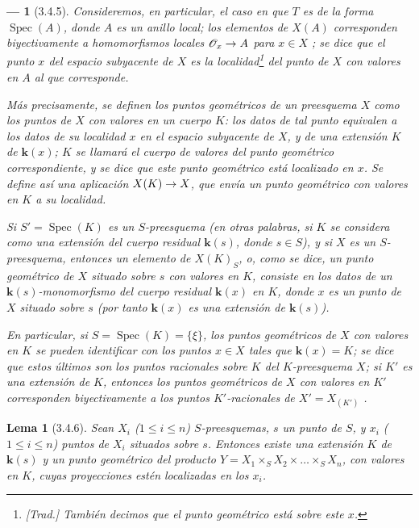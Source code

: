 \documentclass[oneside]{amsart}
\theoremstyle{ega-env-style}
\newtheorem*{env}{---}
\theoremstyle{ega-thm-env-style}
\newtheorem*{lemma}{Lema}
\theoremstyle{ega-defn-env-style}
\def\mathcal{\mathscr}
\def\leq{\leqslant}                 %
\renewcommand{\to}{\mathchoice{\longrightarrow}{\rightarrow}{\rightarrow}{\rightarrow}}
\newcommand{\oldpage}[2][]{{\marginnote{\normalfont{\textbf{#1}~|~#2}}}\ignorespaces}
\let\EGAOriginalLabel\label
\renewcommand{\label}[1]{\phantomsection\EGAOriginalLabel{#1}}
\begin{document}
\begin{env}[3.4.5]
\label{I.3.4.5}
Consideremos, en particular, el caso en que $T$ es de la forma $\operatorname{Spec}(A)$, donde $A$ es un
\emph{anillo local}; los elementos de $X(A)$ corresponden biyectivamente a \emph{homomorfismos
locales} $\mathcal{O}_x\to A$ para $x\in X$ ; se dice que el punto $x$ del espacio
subyacente de $X$ es la \emph{localidad}\footnote{\emph{[Trad.] También decimos que
\emph{el punto geométrico está sobre este $x$}.}} del punto de $X$ con valores en $A$ al que
corresponde.

Más precisamente, se definen los \emph{puntos geométricos} de un preesquema $X$ como los \emph{puntos de
$X$ con valores en un cuerpo $K$}: los datos de tal punto equivalen a los datos de su
\oldpage[I]{113}
localidad $x$ en el espacio subyacente de $X$, y de una \emph{extensión} $K$ de $\boldsymbol{k}(x)$;
$K$ se llamará el \emph{cuerpo de valores} del punto geométrico correspondiente, y se dice que este
punto geométrico está \emph{localizado en $x$}. Se define así una aplicación $X(K)\to X$,
que envía un punto geométrico con valores en $K$ a su localidad.

Si $S'=\operatorname{Spec}(K)$ es un $S$-preesquema (en otras palabras, si $K$ se considera como una extensión
del cuerpo residual $\boldsymbol{k}(s)$, donde $s\in S$), y si $X$ es un $S$-preesquema, entonces un
elemento de $X(K)_S$, o, como se dice, un \emph{punto geométrico de $X$ situado sobre $s$ con valores
en $K$}, consiste en los datos de un $\boldsymbol{k}(s)$-monomorfismo del cuerpo residual $\boldsymbol{k}(x)$
en $K$, donde $x$ es un punto de $X$ \emph{situado sobre $s$} (por tanto $\boldsymbol{k}(x)$ es una
extensión de $\boldsymbol{k}(s)$).

En particular, si $S=\operatorname{Spec}(K)=\{\xi\}$, \emph{los puntos geométricos de $X$ con valores en
$K$ se pueden identificar con los puntos $x\in X$ tales que $\boldsymbol{k}(x)=K$}; se dice que estos últimos
son los \emph{puntos racionales sobre $K$ del $K$-preesquema $X$}; si $K'$ es una extensión de
$K$, entonces los puntos geométricos de $X$ con valores en $K'$ corresponden biyectivamente a los
puntos $K'$-racionales de $X'=X_{(K')}$ .
\end{env}

\begin{lemma}[3.4.6]
\label{I.3.4.6}
Sean $X_i$ ($1\leq i\leq n$) $S$-preesquemas, $s$ un punto de $S$, y $x_i$
($1\leq i\leq n$) puntos de $X_i$ situados sobre $s$. Entonces existe una extensión
$K$ de $\boldsymbol{k}(s)$ y un punto geométrico del producto
$Y=X_1\times_S X_2\times\ldots\times_S X_n$, con valores en $K$, cuyas proyecciones estén
localizadas en los $x_i$.
\end{lemma}
\end{document}
